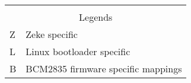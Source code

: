 \begin{table}
\begin{tabular}{l|l}
\multicolumn{2}{c}{} \\
\multicolumn{2}{c}{Legends} \\
\hline
Z & Zeke specific \\
L & Linux bootloader specific \\
B & BCM2835 firmware specific mappings
\end{tabular}
\end{table}







